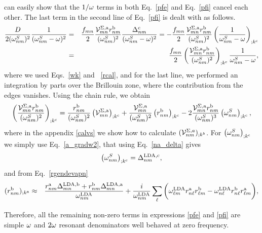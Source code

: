 \documentclass[floatfix,prb,aps,superscriptaddress,11pt,preprint]{revtex4}
\begin{document}
can easily show that the $1/\omega$ terms in both Eq.~\eqref{pfe} and Eq.~\eqref{pfi}
cancel each other.
The last term in the second line of Eq.~\eqref{pfi} is dealt with as
follows.
\begin{eqnarray}\label{dresn}
\frac{D}{2(\omega^S_{nm})^2}\frac{1}{(\omega^S_{nm}-\omega)^2}
&=&
\frac{f_{mn}}{2}\frac{{\mathbf{\cal V}}^{\Sigma,\mathrm{a}}_{mn}r^{\mathrm{b}}_{nm}}{(\omega^S_{nm})^2}
\frac{\Delta^{\mathrm{c}}_{nm}}{(\omega^S_{nm}-\omega)^2} 
=
-
\frac{f_{mn}}{2}
\frac{{\mathbf{\cal V}}^{\Sigma,\mathrm{a}}_{mn}r^{\mathrm{b}}_{nm}}{(\omega^S_{nm})^2}
\left(
\frac{1}{\omega^S_{nm}-\omega}
\right)_{;k^{\mathrm{c}}}
\nonumber\\
&=&
\frac{f_{mn}}{2}
\left(
\frac{{\mathbf{\cal V}}^{\Sigma,\mathrm{a}}_{mn}r^{\mathrm{b}}_{nm}}{(\omega^S_{nm})^2}
\right)_{;k^{\mathrm{c}}}
\frac{1}{\omega^S_{nm}-\omega}
,
\end{eqnarray} 
where we used Eqs.~\eqref{wk} and ~\eqref{rcal}, and for the last
line, we performed an
integration by parts over the Brillouin zone,
where the contribution from the edges vanishes.\cite{aschcroft}
Using the chain rule, we obtain
\begin{eqnarray}\label{chrn1}
\left(
\frac{{\mathbf{\cal V}}^{\Sigma,\mathrm{a}}_{mn}r^{\mathrm{b}}_{nm}}{(\omega^S_{nm})^2}
\right)_{;k^{\mathrm{c}}}
=
\frac{r^{\mathrm{b}}_{nm}}{(\omega^S_{nm})^2}
\left(
{\mathbf{\cal V}} ^{\Sigma,\mathrm{a}}_{mn}
\right)_{;k^{\mathrm{c}}}
+
\frac{{\mathbf{\cal V}}^{\Sigma,\mathrm{a}}_{mn}}{(\omega^S_{nm})^2}
\left(
r^{\mathrm{b}}_{nm}
\right)_{;k^{\mathrm{c}}}
-
2\frac{{\mathbf{\cal V}}^{\Sigma,\mathrm{a}}_{mn}r^{\mathrm{b}}_{nm}}{(\omega^S_{nm})^3}
\left(
\omega^S_{nm}
\right)_{;k^{\mathrm{c}}}
,
\end{eqnarray}
where in the appendix \ref{calvs} 
we show how to calculate $({\mathbf{\cal V}}^{\Sigma,a}_{nm})_{;k^b}$.
For 
$\left(\omega^S_{nm}\right)_{;k^{\mathrm{c}}}$
 we simply use
Eq.~\eqref{a_gradw2}, that using Eq.~\eqref{na_delta} gives
\begin{equation}\label{eli.1}
\left(\omega^S_{nm}\right)_{;k^{\mathrm{c}}}
=\Delta^{\mathrm{LDA},\mathrm{c}}_{nm}
,
\end{equation}
and from Eq.~\eqref{rgendevapn}
\begin{eqnarray}\label{eli.2}
(r^{\mathrm{b}}_{nm})_{;k^{\mathrm{a}}}
&\approx&
\frac{
r^{\mathrm{a}}_{nm}
\Delta^{\mathrm{LDA},\mathrm{b}}_{mn}
+r^{\mathrm{b}}_{nm}
\Delta^{\mathrm{LDA},\mathrm{a}}_{mn}
}
{\omega^{\mathrm{LDA}}_{nm}}
+
\frac{i}{\omega^{\mathrm{LDA}}_{nm}}
\sum_{\ell}
\bigg(
\omega^{\mathrm{LDA}}_{\ell m}
r^{\mathrm{a}}_{n\ell}
r^{\mathrm{b}}_{\ell m}
-
\omega^{\mathrm{LDA}}_{n\ell}
r^{\mathrm{b}}_{n\ell}
r^{\mathrm{a}}_{\ell m}
\bigg)
,
\end{eqnarray}



Therefore, all the remaining non-zero terms in expressions \eqref{pfe}
and \eqref{pfi} 
are simple $\omega$ and $2\omega$ resonant denominators well behaved at zero
frequency. 
\end{document}
